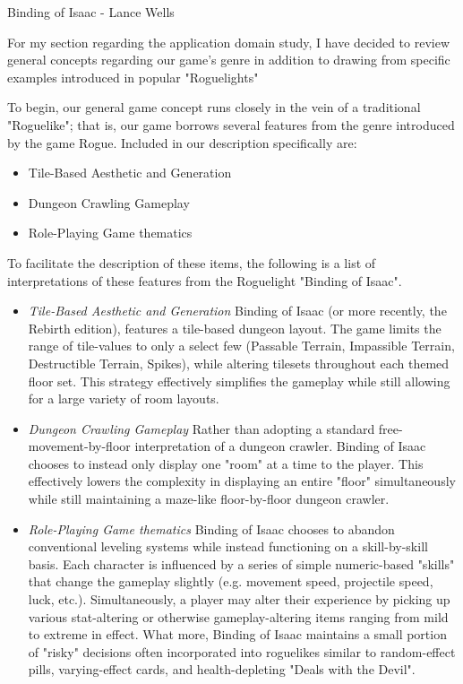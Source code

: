 \documentclass[12pt]{report}
\begin{document}
\begin{section}{Binding of Isaac - Lance Wells}

For my section regarding the application domain study, I have decided to review general concepts 
regarding our game's genre in addition to drawing from specific examples introduced in popular 
"Roguelights"

To begin, our general game concept runs closely in the vein of a traditional "Roguelike"; that is, 
our game borrows several features from the genre introduced by the game Rogue. Included in our 
description specifically are:

\begin{itemize}
\item Tile-Based Aesthetic and Generation
\item Dungeon Crawling Gameplay
\item Role-Playing Game thematics
\end{itemize}
To facilitate the description of these items, the following is a list of interpretations of these 
features from the Roguelight "Binding of Isaac".
\begin{itemize}
\item \emph{Tile-Based Aesthetic and Generation}\newline
Binding of Isaac (or more recently, the Rebirth edition), features a tile-based dungeon layout. 
The game limits the range of tile-values to only a select few (Passable Terrain, Impassible Terrain, 
Destructible Terrain, Spikes), while altering tilesets throughout each themed floor set. This strategy 
effectively simplifies the gameplay while still allowing for a large variety of room layouts.
\item	\emph{Dungeon Crawling Gameplay}\newline
Rather than adopting a standard free-movement-by-floor interpretation of a dungeon crawler. Binding 
of Isaac chooses to instead only display one "room" at a time to the player. This effectively lowers 
the complexity in displaying an entire "floor" simultaneously while still maintaining a maze-like 
floor-by-floor dungeon crawler.
\item	\emph{Role-Playing Game thematics}\newline
Binding of Isaac chooses to abandon conventional leveling systems while instead functioning on a 
skill-by-skill basis. Each character is influenced by a series of simple numeric-based "skills" that 
change the gameplay slightly (e.g. movement speed, projectile speed, luck, etc.). Simultaneously, a 
player may alter their experience by picking up various stat-altering or otherwise gameplay-altering 
items ranging from mild to extreme in effect. What more, Binding of Isaac maintains a small portion of 
"risky" decisions often incorporated into roguelikes similar to random-effect pills, varying-effect 
cards, and health-depleting "Deals with the Devil".
\end{itemize}
\end{section}
\end{document}
